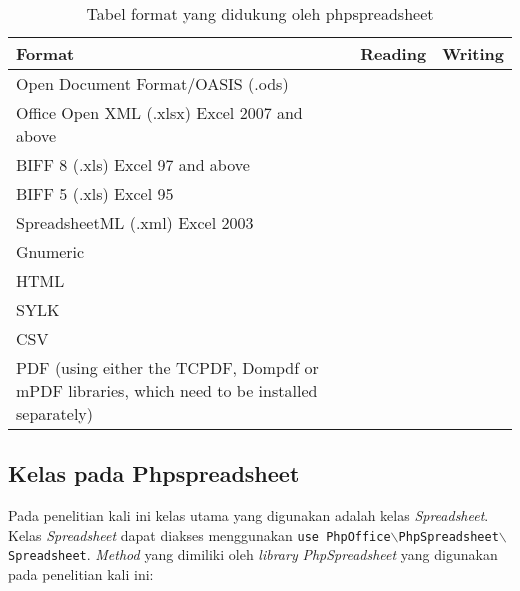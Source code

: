 \begin{table}[H]
	\centering
	\begin{tabular}{|p{}|c|c|}
		\hline
		\textbf{Format} & \textbf{Reading} & \textbf{Writing} \\ \hline
		Open Document Format/OASIS (.ods) & \checkmark & \checkmark \\ \hline
		Office Open XML (.xlsx) Excel 2007 and above & \checkmark & \checkmark \\ \hline
		BIFF 8 (.xls) Excel 97 and above & \checkmark & \checkmark \\ \hline
		BIFF 5 (.xls) Excel 95 & \checkmark  & \\ \hline
		SpreadsheetML (.xml) Excel 2003 & \checkmark & \\ \hline
		Gnumeric & \checkmark & \\ \hline
		HTML & \checkmark & \checkmark \\ \hline
		SYLK & \checkmark & \\ \hline
		CSV & \checkmark & \checkmark \\ \hline
		PDF (using either the TCPDF, Dompdf or mPDF libraries, which need to be installed separately) & & \checkmark \\ 
		\hline
	\end{tabular}
\caption{Tabel format yang didukung oleh phpspreadsheet}
\label{tab:phpspreadsheet supported}
\end{table}

\subsection{Kelas pada Phpspreadsheet}
Pada penelitian kali ini kelas utama yang digunakan adalah kelas \textit{Spreadsheet}. Kelas \textit{Spreadsheet} dapat diakses menggunakan \texttt{use PhpOffice$\backslash$PhpSpreadsheet$\backslash$Spreadsheet}.
 \textit{Method} yang dimiliki oleh \textit{library} \textit{PhpSpreadsheet} yang digunakan pada penelitian kali ini:


